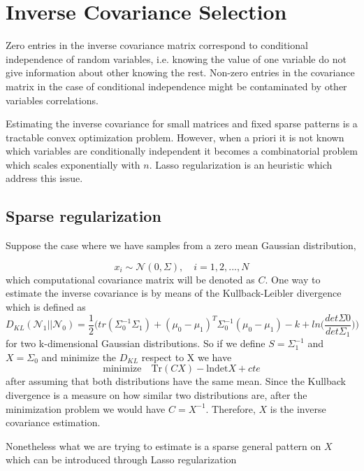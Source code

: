 \section{Inverse Covariance Selection}

Zero entries in the inverse covariance matrix correspond to conditional independence of random variables, i.e. knowing the value of one variable do not give information about other knowing the rest. Non-zero entries in the covariance matrix in the case of conditional independence might be contaminated by other variables correlations.

 Estimating the inverse covariance for small matrices and fixed sparse patterns is a tractable convex optimization problem. However, when a priori it is not known which variables are conditionally independent it becomes a combinatorial problem which scales exponentially with $n$. Lasso regularization is an heuristic which address this issue.

\subsection{Sparse regularization}
Suppose the case where we have samples from a zero mean Gaussian distribution,

\begin{equation*}
	x_i \sim \mathcal{N}(0,\Sigma), \quad i=1,2,...,N
\end{equation*}
which computational covariance matrix will be denoted as $C$. One way to estimate the inverse covariance is by means of the Kullback-Leibler divergence which is defined as 
\begin{equation*}
	D_{KL}(\mathcal{N}_1||\mathcal{N}_0) = \frac{1}{2}\Big(tr(\Sigma^{-1}_0\Sigma_1)+(\mu_0-\mu_1)^T\Sigma^{-1}_0 (\mu_0-\mu_1) -k +ln\Big(\frac{det\Sigma 0}{det \Sigma_1}\Big)\Big)
\end{equation*}
for two k-dimensional Gaussian distributions. So if we define $S = \Sigma^{-1}_1 $ and $X = \Sigma_0$ and minimize the $D_{KL}$ respect to X we have
\begin{equation}
	\mbox{minimize}\quad \textrm{Tr}(CX)-\textrm{lndet} X+ cte
\end{equation}
after assuming that both distributions have the same mean. Since the Kullback divergence is a measure on how similar two distributions are, after the minimization problem we would have $C = X^{-1}$. Therefore, $X$ is the inverse covariance estimation. 

Nonetheless what we are trying to estimate is a sparse general pattern on $X$ which can be introduced through Lasso regularization

